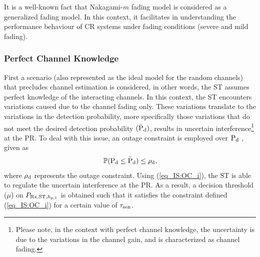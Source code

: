 It is a well-known fact that Nakagami-$m$ fading model is considered as a generalized fading model. In this context, it facilitates in understanding the performance behaviour of CR systems under fading conditions (severe and mild fading). 

\subsubsection{Perfect Channel Knowledge}
First a scenario (also represented as the ideal model for the random channels) that precludes channel estimation is considered, in other words, the ST assumes perfect knowledge of the interacting channels. In this context, the ST encounters variations caused due to the channel fading only. These variations translate to the variations in the detection probability, more specifically those variations that do not meet the desired detection probability $(\bar{\text{P}}_{\text{d}})$, results in uncertain interference\footnote{Please note, in the context with perfect channel knowledge, the uncertainty is due to the variations in the channel gain, and is characterized as channel fading.} at the PR. To deal with this issue, an outage constraint is employed over $\text{P}_{\text{d}}$ \cite{Juarez11}, given as
\begin{align}
\mathbb P( \text{P}_{\text{d}} \le \bar{\text{P}}_{\text{d}}) \le \rho_{\text{d}}, \label{eq_IS:OC_i}
\end{align}
where $\rho_{\text{d}}$ represents the outage constraint. Using (\ref{eq_IS:OC_i}), the ST is able to regulate the uncertain interference at the PR. As a result, a decision threshold ($\mu$) on $P_{\text{Rx,ST,$h_{\text{p,1}}$}}$ is obtained such that it satisfies the constraint defined (\ref{eq_IS:OC_i}) for a certain value of $\tau_{\text{sen}}$.

